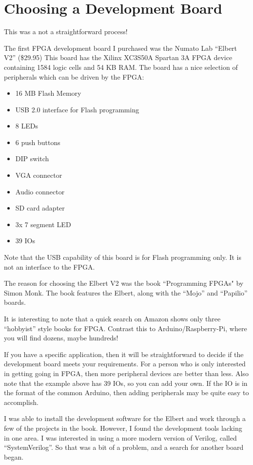 \section{Choosing a Development Board}

This was a not a straightforward process!

The first FPGA development board I purchased was the Numato Lab ``Elbert V2'' (\$29.95)
This board has the Xilinx XC3S50A Spartan 3A FPGA device containing 1584 logic cells and
54 KB RAM.  The board has a nice selection of peripherals which can be driven
by the FPGA:

\begin{itemize}
	\item 16 MB Flash Memory
	\item USB 2.0 interface for Flash programming
	\item 8 LEDs
	\item 6 push buttons
	\item DIP switch
	\item VGA connector
	\item Audio connector
	\item SD card adapter
	\item 3x 7 segment LED
	\item 39 IOs
\end{itemize}

Note that the USB capability of this board is for Flash programming only.  It is not an interface to the FPGA.

The reason for choosing the Elbert V2 was the book ``Programming FPGAs" by Simon Monk.  The book features the Elbert, along with the ``Mojo'' and ``Papilio'' boards.

It is interesting to note that a quick search on Amazon shows only three ``hobbyist'' style books for FPGA.
Contrast this to Arduino/Raspberry-Pi, where you will find dozens, maybe hundreds!

If you have a specific application, then it will be straightforward to decide if the development board meets your requirements.  For a person who is only interested in getting going in FPGA, then more peripheral devices are better than less.  Also note that the example above has 39 IOs, so you can add your own.  If the IO is in the format of the common Arduino, then adding peripherals may be quite easy to accomplish.

I was able to install the development software for the Elbert and work through a few of the projects in the book.
However, I found the development tools lacking in one area.  I was interested in using a more modern version of Verilog, called ``SystemVerilog''.  So that was a bit of a problem, and a search for another board began.

